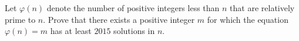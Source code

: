 Let $\varphi(n)$ denote the number of positive integers less than $n$ that are relatively prime to $n$. Prove that there exists a positive integer $m$ for which the equation $\varphi(n)=m$ has at least $2015$ solutions in $n$.